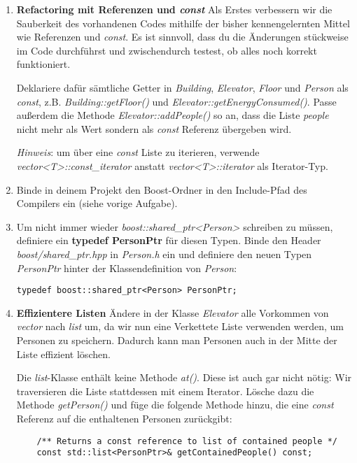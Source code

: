 \documentclass[
  accentcolor=tud1c,	%
  colorbacktitle,		%
  inverttitle,			%
  german,				%
  twoside
]{tudexercise}
\begin{document}
\begin{enumerate}
\item \textbf{Refactoring mit Referenzen und \emph{const}}
Als Erstes verbessern wir die Sauberkeit des vorhandenen Codes mithilfe der bisher kennengelernten Mittel wie Referenzen und \emph{const}.
Es ist sinnvoll, dass du die Änderungen stückweise im Code durchführst und zwischendurch testest, ob alles noch korrekt funktioniert.

Deklariere dafür sämtliche Getter in \emph{Building}, \emph{Elevator}, \emph{Floor} und \emph{Person} als \emph{const}, z.B. \emph{Building::getFloor()} und \emph{Elevator::getEnergyConsumed()}.
Passe außerdem die Methode \emph{Elevator::addPeople()} so an, dass die Liste \emph{people} nicht mehr als Wert sondern als \emph{const} Referenz übergeben wird.

\emph{Hinweis}: um über eine \emph{const} Liste zu iterieren, verwende \emph{vector<T>::const\_iterator} anstatt \emph{vector<T>::iterator} als Iterator-Typ.

\item
Binde in deinem Projekt den Boost-Ordner in den Include-Pfad des Compilers ein (siehe vorige Aufgabe).

\item Um nicht immer wieder \emph{boost::shared\_ptr<Person>} schreiben zu müssen, definiere ein \textbf{typedef PersonPtr} für diesen Typen.
Binde den Header \emph{boost/shared\_ptr.hpp} in \emph{Person.h} ein und definiere den neuen Typen \emph{PersonPtr} hinter der Klassendefinition von \emph{Person}:

\begin{lstlisting}
typedef boost::shared_ptr<Person> PersonPtr;
\end{lstlisting}

\item \textbf{Effizientere Listen}
Ändere in der Klasse \emph{Elevator} alle Vorkommen von \emph{vector} nach \emph{list} um, da wir nun eine Verkettete Liste verwenden werden, um Personen zu speichern.
Dadurch kann man Personen auch in der Mitte der Liste effizient löschen.

Die \emph{list}-Klasse enthält keine Methode \emph{at()}.
Diese ist auch gar nicht nötig:
Wir traversieren die Liste stattdessen mit einem Iterator. 
Lösche dazu die Methode \emph{getPerson()} und füge die folgende Methode hinzu, die eine \emph{const} Referenz auf die enthaltenen Personen zurückgibt:

\begin{lstlisting}
	/** Returns a const reference to list of contained people */
	const std::list<PersonPtr>& getContainedPeople() const;
\end{lstlisting}


\end{enumerate}
\end{document}
